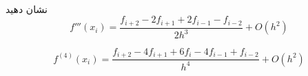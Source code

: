 \\
نشان دهید
\[ f'''(x_i) = \frac{{f_{i+2} - 2f_{i+1} + 2f_{i-1} - f_{i-2}}}{{2h^3}} + O(h^2) \]

\[ f^{(4)}(x_i) = \frac{{f_{i+2} - 4f_{i+1} + 6f_i - 4f_{i-1} + f_{i-2}}}{{h^4}} + O(h^2) \]